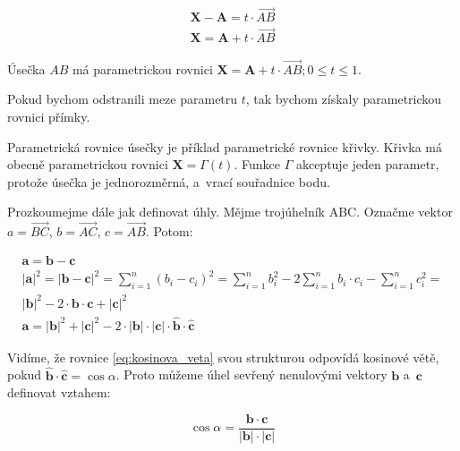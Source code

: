 \documentclass{book}
\newcommand{\vect}[1]{\boldsymbol{#1}}
\newcommand{\unitvect}[1]{\hat{\boldsymbol{#1}}}
\newcommand{\vectpoints}[1]{\overrightarrow{#1}}
\begin{document}
\begin{equation}
\begin{split}
\vect{X} - \vect{A} = t \cdot \vectpoints{AB} \\
\vect{X} = \vect{A} + t \cdot \vectpoints{AB}
\end{split}
\end{equation}

\begin{fact}
Úsečka \(AB\) má parametrickou rovnici \(\vect{X} = \vect{A} + t \cdot \vectpoints{AB}; 0 \leq t \leq 1\).
\end{fact}

Pokud bychom odstranili meze parametru \(t\), tak bychom získaly parametrickou rovnici přímky.

Parametrická rovnice úsečky je příklad parametrické rovnice křivky. Křivka má obecně parametrickou rovnici \(\vect{X} = \Gamma(t)\). Funkce \(\Gamma\) akceptuje jeden parametr, protože úsečka je jednorozměrná, a~vrací souřadnice bodu.

Prozkoumejme dále jak definovat úhly. Mějme trojúhelník ABC. Označme vektor \(a = \vectpoints{BC}\), \(b = \vectpoints{AC}\), \(c = \vectpoints{AB}\). Potom:

\begin{equation}
\label{eq:kosinova_veta}
\begin{split}
\vect{a} = \vect{b} - \vect{c} \\
|\vect{a}|^2 = |\vect{b} - \vect{c}|^2 = \sum_{i=1}^{n} (b_i - c_i)^2 = \sum_{i=1}^{n} b_i^2 - 2 \sum_{i=1}^{n} b_i \cdot c_i - \sum_{i=1}^{n} c_i^2 = \\
|\vect{b}|^2 - 2 \cdot \vect{b} \cdot \vect{c} + |\vect{c}|^2 \\
\vect{a} = |\vect{b}|^2 + |\vect{c}|^2 - 2 \cdot |\vect{b}| \cdot |\vect{c}| \cdot \unitvect{b} \cdot \unitvect{c}
\end{split}
\end{equation}

Vidíme, že rovnice \eqref{eq:kosinova_veta} svou strukturou odpovídá kosinové větě, pokud \(\unitvect{b} \cdot \unitvect{c} = \cos \alpha\). Proto můžeme úhel sevřený nenulovými vektory \(\vect{b}\) a~\(\vect{c}\) definovat vztahem:

\begin{fact}
\begin{equation}
\cos \alpha = \frac{\vect{b} \cdot \vect{c}}{|\vect{b}| \cdot |\vect{c}|}
\end{equation}
\end{fact}
\end{document}
